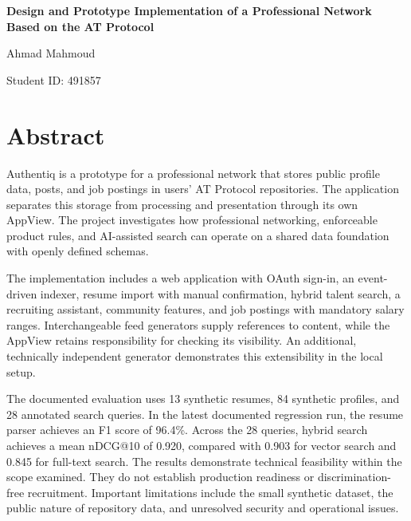 \documentclass[11pt,a4paper]{article}
\begin{document}
\begin{titlepage}
  \centering
  \vspace*{5cm}
  {\LARGE\bfseries Design and Prototype Implementation of a Professional Network Based on the AT Protocol\par}
  \vspace{2.5cm}
  {\large Ahmad Mahmoud\par}
  \vspace{0.3cm}
  {\large Student ID: 491857\par}
  \vfill
\end{titlepage}


\section*{Abstract}

Authentiq is a prototype for a professional network that stores public profile data, posts, and job postings in users' AT Protocol repositories. The application separates this storage from processing and presentation through its own AppView. The project investigates how professional networking, enforceable product rules, and AI-assisted search can operate on a shared data foundation with openly defined schemas.

The implementation includes a web application with OAuth sign-in, an event-driven indexer, resume import with manual confirmation, hybrid talent search, a recruiting assistant, community features, and job postings with mandatory salary ranges. Interchangeable feed generators supply references to content, while the AppView retains responsibility for checking its visibility. An additional, technically independent generator demonstrates this extensibility in the local setup.

The documented evaluation uses 13 synthetic resumes, 84 synthetic profiles, and 28 annotated search queries. In the latest documented regression run, the resume parser achieves an F1 score of 96.4\%. Across the 28 queries, hybrid search achieves a mean nDCG@10 of 0.920, compared with 0.903 for vector search and 0.845 for full-text search. The results demonstrate technical feasibility within the scope examined. They do not establish production readiness or discrimination-free recruitment. Important limitations include the small synthetic dataset, the public nature of repository data, and unresolved security and operational issues.
\end{document}
